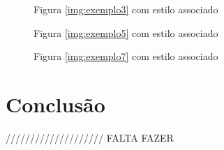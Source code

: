 \documentclass[11pt,a4paper]{report}
\begin{document}
\begin{figure}[H]
\centering
{}
\caption{Figura \ref{img:exemplo3} com estilo associado}
\label{img:exemplo4}
\end{figure}

\begin{figure}[H]
\centering
{}
\caption{Figura \ref{img:exemplo5} com estilo associado}
\label{img:exemplo6}
\end{figure}

\begin{figure}[H]
\centering
{}
\caption{Figura \ref{img:exemplo7} com estilo associado}
\label{img:exemplo8}
\end{figure}

\chapter{Conclusão}
\label{chap:concl}

//////////////////// FALTA FAZER
\end{document}
